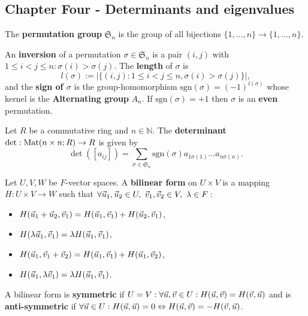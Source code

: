 \begin{multicols}{2}
\section*{Chapter Four - Determinants and eigenvalues}

\begin{definition}
The \textbf{permutation group} $\mathfrak{S}_n$ is the group of all bijections $\{1,\dots,n\}\to\{1,\dots,n\}$.
\end{definition}

\begin{definition}
An \textbf{inversion} of a permutation $\sigma\in\mathfrak{S}_n$ is a pair $(i,j)$ with $1\leq i<j\leq n: \sigma(i)>\sigma(j)$. The \textbf{length} of $\sigma$ is
    \[
    l(\sigma) := |\{(i,j) : 1\leq i<j\leq n, \sigma(i)>\sigma(j)\}|,
    \]
and the \textbf{sign of $\sigma$} is the group-homomorphism $\mathrm{sgn}(\sigma)=(-1)^{l(\sigma)}$ whose kernel is the \textbf{Alternating group} $A_n$. If $\mathrm{sgn}(\sigma)=+1$ then $\sigma$ is an \textbf{even} permutation.
\end{definition}

\begin{definition}
Let $R$ be a commutative ring and $n\in\mathbb{N}$. The \textbf{determinant} $\det:\mathrm{Mat}(n\times n;R)\to R$ is given by
    \[
    \det([a_{ij}]) = 
    \sum_{\sigma\in\mathfrak{S}_n}
    \mathrm{sgn}(\sigma)a_{1\sigma(1)}\dots a_{n\sigma(n)}.
    \]
\end{definition}

\begin{definition}
Let $U,V,W$ be $F$-vector spaces. A \textbf{bilinear form} on $U\times V$ is a mapping $H:U\times V\to W$ such that $\forall \u_1,\u_2\in U,\ \v_1,\v_2\in V,\  \lambda\in F:$
    \begin{itemize}
        \item $H(\vec{u}_1+\vec{u}_2,\vec{v}_1) = H(\vec{u}_1,\vec{v}_1) + H(\vec{u}_2,\vec{v}_1)$,
        \item $H(\lambda\vec{u}_1,\vec{v}_1) = \lambda H(\vec{u}_1,\vec{v}_1)$,
        \item $H(\vec{u}_1,\vec{v}_1+\vec{v}_2) = H(\vec{u}_1,\vec{v}_1) + H(\vec{u}_1,\vec{v}_2)$,
        \item $H(\vec{u}_1,\lambda\vec{v}_1) = \lambda H(\vec{u}_1,\vec{v}_1)$.
    \end{itemize}
A bilinear form is \textbf{symmetric} if $U=V:\forall\vec{u},\vec{v}\in U:H(\vec{u},\vec{v})=H(\vec{v},\vec{u})$ and is \textbf{anti-symmetric} if $\forall\vec{u}\in U:H(\vec{u},\vec{u})=0 \Leftrightarrow H(\vec{u},\vec{v})=-H(\vec{v},\vec{u})$.
\end{definition}


\end{multicols}
